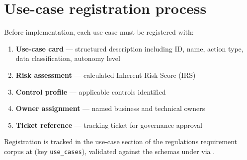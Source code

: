 \section{Use-case registration process}

Before implementation, each use case must be registered with:

\begin{enumerate}
  \item \textbf{Use-case card} --- structured description including ID, name,
        action type, data classification, autonomy level
  \item \textbf{Risk assessment} --- calculated Inherent Risk Score (IRS)
  \item \textbf{Control profile} --- applicable controls identified
  \item \textbf{Owner assignment} --- named business and technical owners
  \item \textbf{Ticket reference} --- tracking ticket for governance approval
\end{enumerate}

Registration is tracked in the use-case section of the regulations
requirement corpus at
(key \texttt{use\_cases}), validated against the schemas under
 via
.
